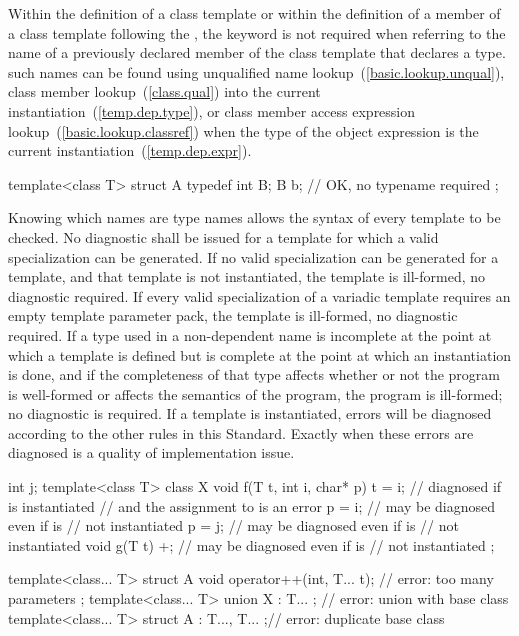 \pnum
Within the definition of a class template or within the definition of a
member of a class template following the , the keyword
is not required when referring to the name of a previously
declared member of the class template that declares a type.
\enternote such names can be found using unqualified name lookup~(\ref{basic.lookup.unqual}),
class member lookup~(\ref{class.qual}) into the current instantiation~(\ref{temp.dep.type}),
or class member access expression lookup~(\ref{basic.lookup.classref}) when the
type of the object expression is the current instantiation~(\ref{temp.dep.expr}).
\exitnote
\enterexample

\begin{codeblock}
template<class T> struct A {
  typedef int B;
  B b;              // OK, no typename required
};
\end{codeblock}
\exitexample

\pnum
{}%
%
Knowing which names are type names allows the syntax of every template
to be checked.
No diagnostic shall be issued for a template
for which a valid specialization can be generated.
If no valid specialization can be generated
for a template,
and that template is not instantiated, the template is ill-formed,
no diagnostic required.
If every valid specialization of a variadic template requires an empty template
parameter pack, the template is ill-formed, no diagnostic required.
If a type used in a non-dependent name is incomplete
at the point at which a template is defined but is
complete at the point at which an instantiation is done,
and if the completeness of that type affects whether or
not the program is well-formed or affects the semantics
of the program, the program is ill-formed; no diagnostic
is required.
\enternote
If a template is instantiated, errors will be diagnosed according
to the other rules in this Standard.
Exactly when these errors are diagnosed is a quality of implementation issue.
\exitnote
\enterexample

\begin{codeblock}
int j;
template<class T> class X {
  void f(T t, int i, char* p) {
    t = i;          // diagnosed if  is instantiated
                    // and the assignment to  is an error
    p = i;          // may be diagnosed even if  is
                    // not instantiated
    p = j;          // may be diagnosed even if  is
                    // not instantiated
  }
  void g(T t) {
    +;              // may be diagnosed even if  is
                    // not instantiated
  }
};

template<class... T> struct A {
  void operator++(int, T... t);                 // error: too many parameters
};
template<class... T> union X : T... { };        // error: union with base class
template<class... T> struct A : T...,  T... { };// error: duplicate base class
\end{codeblock}
\exitexample

